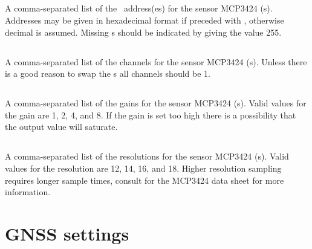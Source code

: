 \subsection[adc-address-list]{}

A comma-separated list of the \itwoc\ address(es) for the sensor
MCP3424 \adc(s).  Addresses may be given in hexadecimal format if
preceded with , otherwise decimal is assumed. Missing \adc s
should be indicated by giving the value 255.


\subsection[adc-channel-list]{}

A comma-separated list of the channels for the sensor MCP3424
\adc(s). Unless there is a good reason to swap the \adc s all channels
should be 1.


\subsection[adc-gain-list]{}

A comma-separated list of the gains for the sensor MCP3424
\adc(s). Valid values for the gain are 1, 2, 4, and 8. If the gain is
set too high there is a possibility that the output value will
saturate. %


\subsection[adc-resolution-list]{}

A comma-separated list of the resolutions for the sensor MCP3424
\adc(s). Valid values for the resolution are 12, 14, 16, and
18. Higher resolution sampling requires longer sample times, consult
for the MCP3424 data sheet for more information.

\section{GNSS settings}

